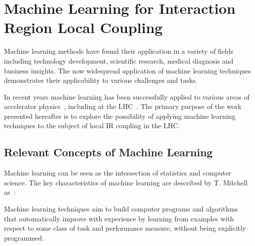 \chapter{Machine Learning for Interaction Region Local Coupling}
\label{chapter:ml_local_coupling}

Machine learning methods have found their application in a variety of fields including technology development, scientific research, medical diagnosis and business insights.
The now widespread application of machine learning techniques demonstrates their applicability to various challenges and tasks.

In recent years machine learning has been successfully applied to various areas of accelerator physics~\cite{PRAB:Edelen:Machine_Learning_Optimization_Particle_Accelerator_Systems,PRAB:Gao:Bayesian_Optimization_Trajectory_Alignment,PRAB:Ivanov:Physics_Based_Deep_Neural_Networks_Beam_Dynamics,PRL:Roussel:Phase_Space_Reconstruction_Neural_Networks,PRAB:Kranjcevic:Multiobjective_Optimization_Dynamic_Aperture,PRL:Jalas:Bayesian_Optimization_Laser_Plasma_Accelerator,PRL:Duris:Bayesian_Optimization_Free_Electron_Laser,IPAC:Biedron:Adding_Data_Science_and_More_Intelligence_to_Our_Accelerator_Toolbox,IEEE:Edelen:Neural_Networks_Modeling_Control_Particle_Accelerators,PRAB:Emma:Machine_Learning_Longitudinal_Phase_Space_Prediction,IBIC:Xu:Machine_Learning_Image_Processing_Technology_Application_in_Bunch_Longitudinal_Phase_Data_Information_Extraction}, including at the \gls{LHC}~\cite{PRAB:Fol:Detection_Faulty_BPMs,EPJP:Fol:Supervised_Learning_Reconstruction_Magnet_Errors,PHD:Fol:Application_ML_Beam_Optics}.
The primary purpose of the work presented hereafter is to explore the possibility of applying machine learning techniques to the subject of local \gls{IR} coupling in the LHC.


\section{Relevant Concepts of Machine Learning}
\label{section:concepts_of_machine_learning}

Machine learning can be seen as the intersection of statistics and computer science.
The key characteristics of machine learning are described by T. Mitchell as~\cite{BOOK:Mitchell:Machine_Learning}:

\begin{quoteblock}
    Machine learning techniques aim to build computer programs and algorithms that automatically improve with experience by learning from examples with respect to some class of task and performance measure, without being explicitly programmed.
\end{quoteblock}

